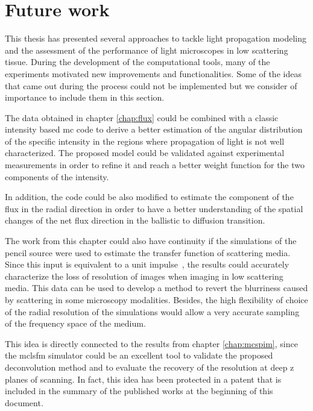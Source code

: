 \chapter*{Future work}

This thesis has presented several approaches to tackle light propagation modeling and the assessment of the performance of light microscopes in low scattering tissue. During the development of the computational tools, many of the experiments motivated new improvements and functionalities. Some of the ideas that came out during the process could not be implemented but we consider of importance to include them in this section.

The data obtained in chapter \ref{chap:flux} could be combined with a classic intensity based \gls{mc} code to derive a better estimation of the angular distribution of the specific intensity in the regions where propagation of light is not well characterized. The proposed model could be validated against experimental measurements in order to refine it and reach a better weight function for the two components of the intensity. 

In addition, the code could be also modified to estimate the component of the flux in the radial direction in order to have a better understanding of the spatial changes of the net flux direction in the ballistic to diffusion transition.

The work from this chapter could also have continuity if the simulations of the pencil source were used to estimate the transfer function of scattering media. Since this input is equivalent to a unit impulse~\cite{Ripoll1999}, the results could accurately characterize the loss of resolution of images when imaging in low scattering media. This data can be used to develop a method to revert the blurriness caused by scattering in some microscopy modalities. Besides, the high flexibility of choice of the radial resolution of the simulations would allow a very accurate sampling of the frequency space of the medium. 

This idea is directly connected to the results from chapter \ref{chap:mcspim}, since the \gls{mclsfm} simulator could be an excellent tool to validate the proposed deconvolution method and to evaluate the recovery of the resolution at deep z planes of scanning. In fact, this idea has been protected in a patent that is included in the summary of the published works at the beginning of this document.  
 
